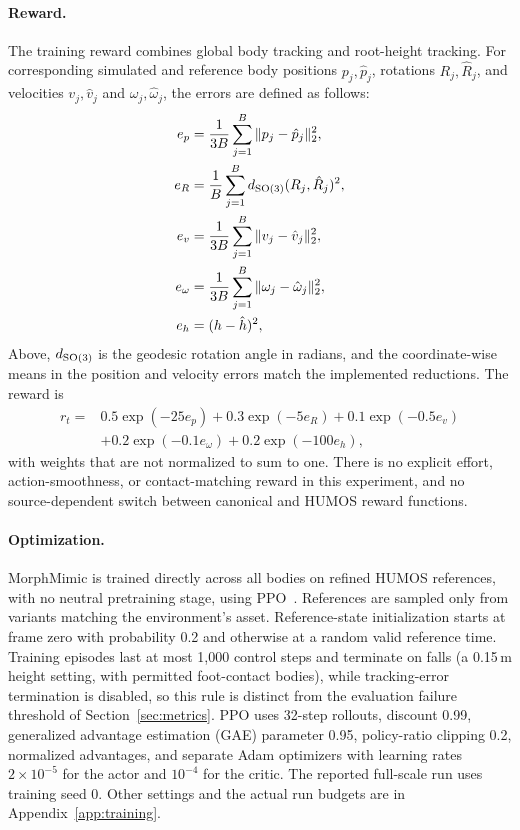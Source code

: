 \paragraph{Reward.}
The training reward combines global body tracking and root-height tracking. For
corresponding simulated and reference body positions $p_j,\hat{p}_j$, rotations
$R_j,\hat{R}_j$, and velocities $v_j,\hat{v}_j$ and $\omega_j,\hat{\omega}_j$,
the errors are defined as follows:
\begin{align}
    e_p &= \frac{1}{3B}\sum_{j=1}^{B}\|p_j-\hat{p}_j\|_2^2,
    \\
    e_R &= \frac{1}{B}\sum_{j=1}^{B}
                  d_{\mathrm{SO}(3)}(R_j,\hat{R}_j)^2, \\
    e_v &= \frac{1}{3B}\sum_{j=1}^{B}\|v_j-\hat{v}_j\|_2^2,
    \\
    e_\omega &= \frac{1}{3B}\sum_{j=1}^{B}
                     \|\omega_j-\hat{\omega}_j\|_2^2, \\
    e_h &= (h-\hat{h})^2,
\end{align}
Above, $d_{\mathrm{SO}(3)}$ is the geodesic rotation angle in radians, and the
coordinate-wise means in the position and velocity errors match the implemented
reductions. The reward is
\begin{equation}
\begin{split}
    r_t ={}& 0.5\exp(-25e_p) + 0.3\exp(-5e_R)
             + 0.1\exp(-0.5e_v)\\
           &+0.2\exp(-0.1e_\omega) + 0.2\exp(-100e_h),
\end{split}\label{eq:reward}
\end{equation}
with weights that are not normalized to sum to one. There is no explicit
effort, action-smoothness, or contact-matching reward in this experiment, and no
source-dependent switch between canonical and HUMOS reward functions.

\paragraph{Optimization.}
MorphMimic is trained directly across all bodies on refined HUMOS references,
with no neutral pretraining stage, using PPO~\cite{ppo}. References are sampled
only from variants matching the environment's asset.
Reference-state initialization starts at frame zero with probability 0.2 and
otherwise at a random valid reference time. Training episodes last at most
1,000 control steps and terminate on falls (a 0.15\,m height setting, with
permitted foot-contact bodies), while tracking-error termination is disabled, so
this rule is distinct from the evaluation failure threshold of
Section~\ref{sec:metrics}. PPO uses 32-step rollouts, discount 0.99, generalized
advantage estimation (GAE) parameter 0.95, policy-ratio clipping 0.2, normalized
advantages, and separate Adam optimizers with learning rates $2\times10^{-5}$ for
the actor and $10^{-4}$ for the critic. The reported full-scale run uses training
seed 0. Other settings and the actual run budgets are in
Appendix~\ref{app:training}.

